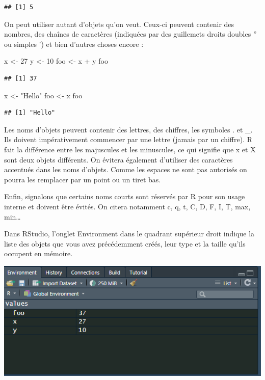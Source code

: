\documentclass[
]{book}
\newenvironment{Shaded}{\begin{snugshade}}{\end{snugshade}}
\newcommand{\DecValTok}[1]{\textcolor[rgb]{0.00,0.00,0.81}{#1}}
\newcommand{\NormalTok}[1]{#1}
\newcommand{\OtherTok}[1]{\textcolor[rgb]{0.56,0.35,0.01}{#1}}
\newcommand{\SpecialCharTok}[1]{\textcolor[rgb]{0.00,0.00,0.00}{#1}}
\newcommand{\StringTok}[1]{\textcolor[rgb]{0.31,0.60,0.02}{#1}}
\begin{document}
\begin{verbatim}
## [1] 5
\end{verbatim}

On peut utiliser autant d'objets qu'on veut. Ceux-ci peuvent contenir des nombres, des chaînes de caractères (indiquées par des guillemets droits doubles '' ou simples ') et bien d'autres choses encore :

\begin{Shaded}
\begin{Highlighting}[]
\NormalTok{x }\OtherTok{\textless{}{-}} \DecValTok{27}
\NormalTok{y }\OtherTok{\textless{}{-}} \DecValTok{10}
\NormalTok{foo }\OtherTok{\textless{}{-}}\NormalTok{ x }\SpecialCharTok{+}\NormalTok{ y}
\NormalTok{foo}
\end{Highlighting}
\end{Shaded}

\begin{verbatim}
## [1] 37
\end{verbatim}

\begin{Shaded}
\begin{Highlighting}[]
\NormalTok{x }\OtherTok{\textless{}{-}} \StringTok{"Hello"}
\NormalTok{foo }\OtherTok{\textless{}{-}}\NormalTok{ x}
\NormalTok{foo}
\end{Highlighting}
\end{Shaded}

\begin{verbatim}
## [1] "Hello"
\end{verbatim}

Les noms d'objets peuvent contenir des lettres, des chiffres, les symboles . et \_. Ils doivent impérativement commencer par une lettre (jamais par un chiffre). R fait la différence entre les majuscules et les minuscules, ce qui signifie que x et X sont deux objets différents. On évitera également d'utiliser des caractères accentués dans les noms d'objets. Comme les espaces ne sont pas autorisés on pourra les remplacer par un point ou un tiret bas.

Enfin, signalons que certains noms courts sont réservés par R pour son usage interne et doivent être évités. On citera notamment c, q, t, C, D, F, I, T, max, min\ldots{}

Dans RStudio, l'onglet Environment dans le quadrant supérieur droit indique la liste des objets que vous avez précédemment créés, leur type et la taille qu'ils occupent en mémoire.

\includegraphics[width=1\linewidth]{images/environement}
\end{document}
